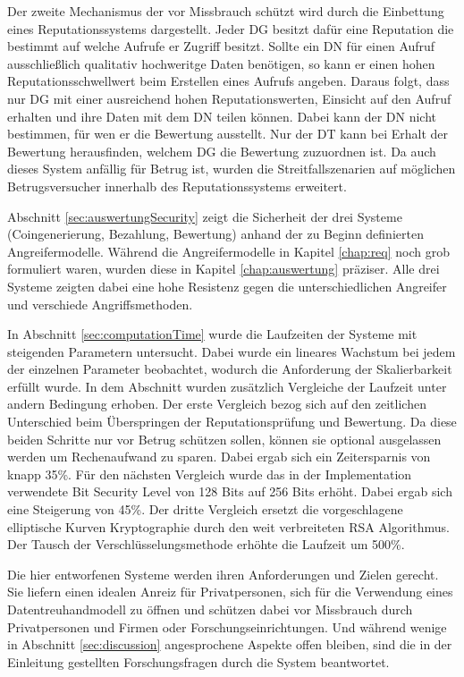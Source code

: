 \documentclass[
	fontsize=11pt,
	headings=small,
	parskip=half,           %
	bibliography=totoc,
	numbers=noenddot,       %
	open=any,               %
]{scrreprt}
\begin{document}
Der zweite Mechanismus der vor Missbrauch schützt wird durch die Einbettung eines Reputationssystems dargestellt. Jeder DG besitzt dafür eine Reputation die bestimmt auf welche Aufrufe er Zugriff besitzt. Sollte ein DN für einen Aufruf ausschließlich qualitativ hochweritge Daten benötigen, so kann er einen hohen Reputationsschwellwert beim Erstellen eines Aufrufs angeben. Daraus folgt, dass nur DG mit einer ausreichend hohen Reputationswerten, Einsicht auf den Aufruf erhalten und ihre Daten mit dem DN teilen können. Dabei kann der DN nicht bestimmen, für wen er die Bewertung ausstellt. Nur der DT kann bei Erhalt der Bewertung herausfinden, welchem DG die Bewertung zuzuordnen ist. Da auch dieses System anfällig für Betrug ist, wurden die Streitfallszenarien auf möglichen Betrugsversucher innerhalb des Reputationssystems erweitert. 

Abschnitt \ref{sec:auswertungSecurity} zeigt die Sicherheit der drei Systeme (Coingenerierung, Bezahlung, Bewertung) anhand der zu Beginn definierten Angreifermodelle. Während die Angreifermodelle in Kapitel \ref{chap:req} noch grob formuliert waren, wurden diese in Kapitel \ref{chap:auswertung} präziser. Alle drei Systeme zeigten dabei eine hohe Resistenz gegen die unterschiedlichen Angreifer und verschiede Angriffsmethoden.

In Abschnitt \ref{sec:computationTime} wurde die Laufzeiten der Systeme mit steigenden Parametern untersucht. Dabei wurde ein lineares Wachstum bei jedem der einzelnen Parameter beobachtet, wodurch die Anforderung der Skalierbarkeit erfüllt wurde. In dem Abschnitt wurden zusätzlich Vergleiche der Laufzeit unter andern Bedingung erhoben. Der erste Vergleich bezog sich auf den zeitlichen Unterschied beim Überspringen der Reputationsprüfung und Bewertung. Da diese beiden Schritte nur vor Betrug schützen sollen, können sie optional ausgelassen werden um Rechenaufwand zu sparen. Dabei ergab sich ein Zeitersparnis von knapp 35\%. Für den nächsten Vergleich wurde das in der Implementation verwendete Bit Security Level von 128 Bits auf 256 Bits erhöht. Dabei ergab sich eine Steigerung von 45\%. Der dritte Vergleich ersetzt die vorgeschlagene elliptische Kurven Kryptographie durch den weit verbreiteten RSA Algorithmus. Der Tausch der Verschlüsselungsmethode erhöhte die Laufzeit um 500\%.

Die hier entworfenen Systeme werden ihren Anforderungen und Zielen gerecht. Sie liefern einen idealen Anreiz für Privatpersonen, sich für die Verwendung eines Datentreuhandmodell zu öffnen und schützen dabei vor Missbrauch durch Privatpersonen und Firmen oder Forschungseinrichtungen. Und während wenige in Abschnitt \ref{sec:discussion} angesprochene Aspekte offen bleiben, sind die in der Einleitung gestellten Forschungsfragen durch die System beantwortet.
\end{document}

